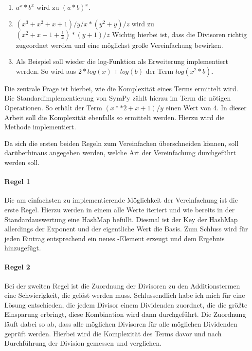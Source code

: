 \documentclass[11pt,a4paper, ngerman]{article}
\begin{document}
\begin{enumerate}
    \item $a^x * b^x$ wird zu $(a*b)^x$.
    \item $(x^3+x^2+x+1)/y/x*(y^2+y)/z$ wird zu $(x^2+x+1+\frac{1}{x})*(y+1)/z$ Wichtig hierbei ist, dass die Divisoren richtig zugeordnet werden und eine möglichst große Vereinfachung bewirken.
    \item Als Beispiel soll wieder die log-Funktion als Erweiterung implementiert werden. So wird aus $2*log(x)+log(b)$ der Term $log(x^2*b)$.
\end{enumerate}

Die zentrale Frage ist hierbei, wie die Komplexität eines Terms ermittelt wird. Die Standardimplementierung von SymPy zählt hierzu im Term die nötigen Operationen. So erhält der Term $(x**2+x+1)/y$ einen Wert von 4. In dieser Arbeit soll die Komplexität ebenfalls so ermittelt werden. Hierzu wird die Methode  implementiert.

Da sich die ersten beiden Regeln zum Vereinfachen überschneiden können, soll darüberhinaus angegeben werden, welche Art der Vereinfachung durchgeführt werden soll.

\paragraph{Regel 1} Die am einfachsten zu implementierende Möglichkeit der Vereinfachung ist die erste Regel. Hierzu werden in einem  alle Werte iteriert und wie bereits in der Standardauswertung eine HashMap befüllt. Diesmal ist der Key der HashMap allerdings der Exponent und der eigentliche Wert die Basis. Zum Schluss wird für jeden Eintrag entsprechend ein neues -Element erzeugt und dem Ergebnis hinzugefügt.

\paragraph{Regel 2} Bei der zweiten Regel ist die Zuordnung der Divisoren zu den Additionstermen eine Schwierigkeit, die gelöst werden muss. Schlussendlich habe ich mich für eine Lösung entschieden, die jedem Divisor einem Dividenden zuordnet, die die größte Einsparung erbringt, diese Kombination wird dann durchgeführt. Die Zuordnung läuft dabei so ab, dass alle möglichen Divisoren für alle möglichen Dividenden geprüft werden. Hierbei wird die Komplexität des Terms davor und nach Durchführung der Division gemessen und verglichen.
\end{document}

